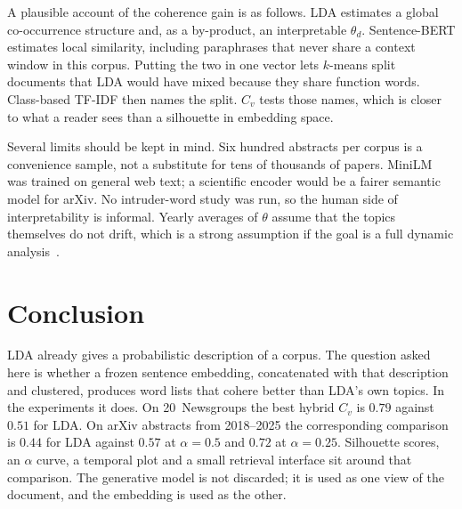 \documentclass[11pt,a4paper]{article}
\begin{document}
A plausible account of the coherence gain is as follows. LDA estimates a global co-occurrence structure and, as a by-product, an interpretable $\theta_d$. Sentence-BERT estimates local similarity, including paraphrases that never share a context window in this corpus. Putting the two in one vector lets $k$-means split documents that LDA would have mixed because they share function words. Class-based TF-IDF then names the split. $C_v$ tests those names, which is closer to what a reader sees than a silhouette in embedding space.

Several limits should be kept in mind. Six hundred abstracts per corpus is a convenience sample, not a substitute for tens of thousands of papers. MiniLM was trained on general web text; a scientific encoder would be a fairer semantic model for arXiv. No intruder-word study was run, so the human side of interpretability is informal. Yearly averages of $\theta$ assume that the topics themselves do not drift, which is a strong assumption if the goal is a full dynamic analysis~\cite{blei2006}.

\section{Conclusion}
\label{sec:end}

LDA already gives a probabilistic description of a corpus. The question asked here is whether a frozen sentence embedding, concatenated with that description and clustered, produces word lists that cohere better than LDA's own topics. In the experiments it does. On 20~Newsgroups the best hybrid $C_v$ is $0.79$ against $0.51$ for LDA. On arXiv abstracts from 2018--2025 the corresponding comparison is $0.44$ for LDA against $0.57$ at $\alpha=0.5$ and $0.72$ at $\alpha=0.25$. Silhouette scores, an $\alpha$ curve, a temporal plot and a small retrieval interface sit around that comparison. The generative model is not discarded; it is used as one view of the document, and the embedding is used as the other.
\end{document}
